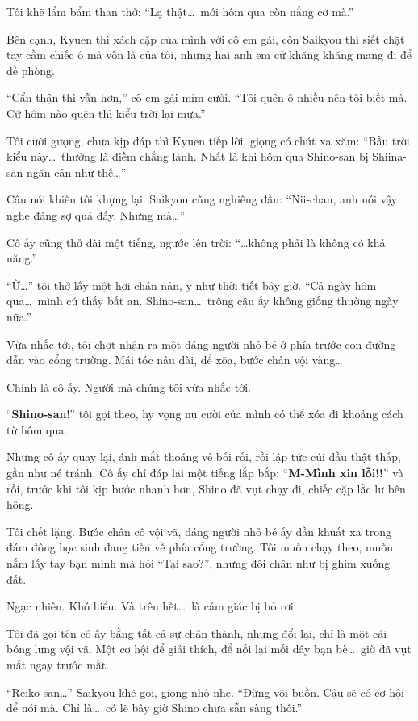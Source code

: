 \documentclass[../main.tex]{subfiles}
\begin{document}
Tôi khẽ lẩm bẩm than thở: ``Lạ thật\dots\ mới hôm qua còn nắng cơ mà.''

Bên cạnh, Kyuen thì xách cặp của mình với cô em gái, còn Saikyou thì siết chặt tay cầm chiếc ô mà vốn là của tôi, nhưng hai anh em cứ khăng khăng mang đi để đề phòng.

``Cẩn thận thì vẫn hơn,'' cô em gái mỉm cười. ``Tôi quên ô nhiều nên tôi biết mà. Cứ hôm nào quên thì kiểu trời lại mưa.''

Tôi cười gượng, chưa kịp đáp thì Kyuen tiếp lời, giọng có chút xa xăm:
``Bầu trời kiểu này\dots\ thường là điềm chẳng lành. Nhất là khi hôm qua Shino-san bị Shiina-san ngăn cản như thế\dots''

Câu nói khiến tôi khựng lại. Saikyou cũng nghiêng đầu: ``Nii-chan, anh nói vậy nghe đáng sợ quá đấy. Nhưng mà\dots''

Cô ấy cũng thở dài một tiếng, ngước lên trời: ``\dots không phải là không có khả năng.''

``Ừ\dots'' tôi thở lấy một hơi chán nản, y như thời tiết bây giờ. ``Cả ngày hôm qua\dots\ mình cứ thấy bất an. Shino-san\dots\ trông cậu ấy không giống thường ngày nữa.''

Vừa nhắc tới, tôi chợt nhận ra một dáng người nhỏ bé ở phía trước con đường dẫn vào cổng trường. Mái tóc nâu dài, để xõa, bước chân vội vàng\dots

Chính là cô ấy. Người mà chúng tôi vừa nhắc tới.

``\textbf{Shino-san}!'' tôi gọi theo, hy vọng nụ cười của mình có thể xóa đi khoảng cách từ hôm qua.

Nhưng cô ấy quay lại, ánh mắt thoáng vẻ bối rối, rồi lập tức cúi đầu thật thấp, gần như né tránh. Cô ấy chỉ đáp lại một tiếng lắp bắp: ``\textbf{M-Mình xin lỗi!!}'' và rồi, trước khi tôi kịp bước nhanh hơn, Shino đã vụt chạy đi, chiếc cặp lắc lư bên hông.

Tôi chết lặng. Bước chân cô vội vã, dáng người nhỏ bé ấy dần khuất xa trong đám đông học sinh đang tiến về phía cổng trường. Tôi muốn chạy theo, muốn nắm lấy tay bạn mình mà hỏi ``Tại sao?'', nhưng đôi chân như bị ghim xuống đất.

Ngạc nhiên. Khó hiểu. Và trên hết\dots\ là cảm giác bị bỏ rơi.

Tôi đã gọi tên cô ấy bằng tất cả sự chân thành, nhưng đổi lại, chỉ là một cái bóng lưng vội vã. Một cơ hội để giải thích, để nối lại mối dây bạn bè\dots\ giờ đã vụt mất ngay trước mắt.

``Reiko-san\dots'' Saikyou khẽ gọi, giọng nhỏ nhẹ. ``Đừng vội buồn. Cậu sẽ có cơ hội để nói mà. Chỉ là\dots\ có lẽ bây giờ Shino chưa sẵn sàng thôi.''
\end{document}
